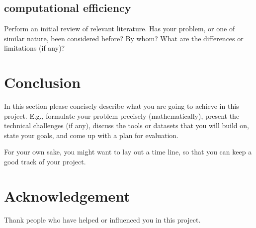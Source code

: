 \documentclass{article}
\begin{document}
\subsection{computational efficiency}
Perform an initial review of relevant literature. Has your problem, or one of similar nature, been considered before? By whom? What are the differences or limitations (if any)?

\section{Conclusion}
In this section please concisely describe what you are going to achieve in this project. E.g., formulate your problem precisely (mathematically), present the technical challenges (if any), discuss the tools or datasets that you will build on, state your goals, and come up with a plan for evaluation.

For your own sake, you might want to lay out a time line, so that you can keep a good track of your project.

\newpage

\section*{Acknowledgement}
Thank people who have helped or influenced you in this project.

\nocite{*}



\end{document}
